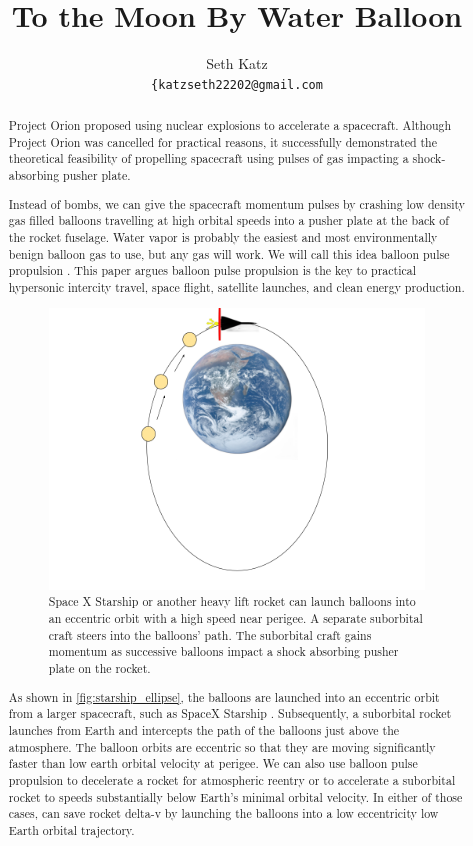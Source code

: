 \documentclass{article}
\title{To the Moon By Water Balloon}
\author{
  Seth Katz \\
  \texttt{\{katzseth22202@gmail.com} \\
}
\begin{document}
\maketitle
\tableofcontents

\begin{abstract}
    Project Orion \cite{projorion} proposed using nuclear explosions to accelerate a spacecraft.  Although Project Orion was cancelled for practical reasons,  it successfully demonstrated the theoretical feasibility of propelling spacecraft using pulses of gas impacting a shock-absorbing pusher plate.

    Instead of bombs, we can give the spacecraft momentum pulses by crashing low density gas filled balloons travelling at high orbital speeds into a pusher plate at the back of the rocket fuselage.   Water vapor is probably the easiest and most environmentally benign balloon gas to use, but any gas will work.   We will call this idea balloon pulse propulsion \cite{aim2024}.   This paper argues balloon pulse propulsion is the key to practical hypersonic intercity travel, space flight, satellite launches,  and clean energy production.
 \begin{figure}[h]
    \centering
    \includegraphics[width=0.5\linewidth]{images/Starship_Impact_ellipse.png}
    \caption{Space X Starship or another heavy lift rocket  can launch balloons into an eccentric orbit with a high speed near perigee.   A separate suborbital craft steers into the balloons' path.   The suborbital craft gains momentum as successive balloons impact a shock absorbing pusher plate on the rocket.}
    \label{fig:starship_ellipse}
\end{figure}

As shown in \autoref{fig:starship_ellipse}, the balloons are launched into an eccentric orbit from a larger spacecraft, such as SpaceX Starship \cite{starship}.   Subsequently, a suborbital rocket launches from Earth and intercepts the path of the balloons just above the atmosphere.    The balloon orbits are eccentric so that they are moving significantly faster than low earth orbital velocity at perigee.   We can also use balloon pulse propulsion to decelerate a rocket for atmospheric reentry or to accelerate a suborbital rocket  to speeds substantially below Earth's minimal orbital velocity.    In either of those cases, can save rocket delta-v by launching the balloons into a low eccentricity low Earth orbital trajectory.   


\end{abstract}
\end{document}
